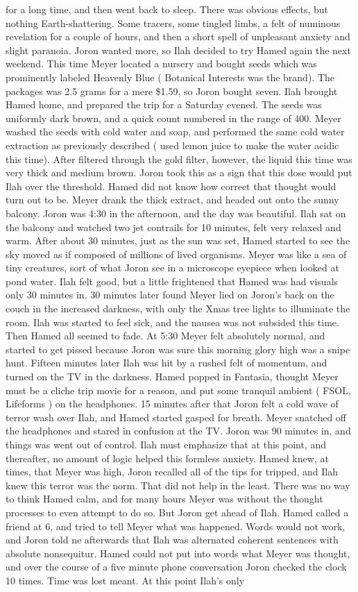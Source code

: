\documentclass[12pt]{book}
\begin{document}
for a long time, and then went back to sleep. There was obvious effects, but nothing Earth-shattering. Some tracers, some tingled limbs, a felt of numinous revelation for a couple of hours, and then a short spell of unpleasant anxiety and slight paranoia. Joron wanted more, so Ilah decided to try Hamed again the next weekend. This time Meyer located a nursery and bought seeds which was prominently labeled Heavenly Blue ( Botanical Interests was the brand). The packages was 2.5 grams for a mere \$1.59, so Joron bought seven. Ilah brought Hamed home, and prepared the trip for a Saturday evened. The seeds was uniformly dark brown, and a quick count numbered in the range of 400. Meyer washed the seeds with cold water and soap, and performed the same cold water extraction as previously described ( used lemon juice to make the water acidic this time). After filtered through the gold filter, however, the liquid this time was very thick and medium brown. Joron took this as a sign that this dose would put Ilah over the threshold. Hamed did not know how correct that thought would turn out to be. Meyer drank the thick extract, and headed out onto the sunny balcony. Joron was 4:30 in the afternoon, and the day was beautiful. Ilah sat on the balcony and watched two jet contrails for 10 minutes, felt very relaxed and warm. After about 30 minutes, just as the sun was set, Hamed started to see the sky moved as if composed of millions of lived organisms. Meyer was like a sea of tiny creatures, sort of what Joron see in a microscope eyepiece when looked at pond water. Ilah felt good, but a little frightened that Hamed was had visuals only 30 minutes in. 30 minutes later found Meyer lied on Joron's back on the couch in the increased darkness, with only the Xmas tree lights to illuminate the room. Ilah was started to feel sick, and the nausea was not subsided this time. Then Hamed all seemed to fade. At 5:30 Meyer felt absolutely normal, and started to get pissed because Joron was sure this morning glory high was a snipe hunt. Fifteen minutes later Ilah was hit by a rushed felt of momentum, and turned on the TV in the darkness. Hamed popped in Fantasia, thought Meyer must be a cliche trip movie for a reason, and put some tranquil ambient ( FSOL, Lifeforms ) on the headphones. 15 minutes after that Joron felt a cold wave of terror wash over Ilah, and Hamed started gasped for breath. Meyer snatched off the headphones and stared in confusion at the TV. Joron was 90 minutes in, and things was went out of control. Ilah must emphasize that at this point, and thereafter, no amount of logic helped this formless anxiety. Hamed knew, at times, that Meyer was high, Joron recalled all of the tips for tripped, and Ilah knew this terror was the norm. That did not help in the least. There was no way to think Hamed calm, and for many hours Meyer was without the thought processes to even attempt to do so. But Joron get ahead of Ilah. Hamed called a friend at 6, and tried to tell Meyer what was happened. Words would not work, and Joron told ne afterwards that Ilah was alternated coherent sentences with absolute nonsequitur. Hamed could not put into words what Meyer was thought, and over the course of a five minute phone conversation Joron checked the clock 10 times. Time was lost meant. At this point Ilah's only 
\end{document}
